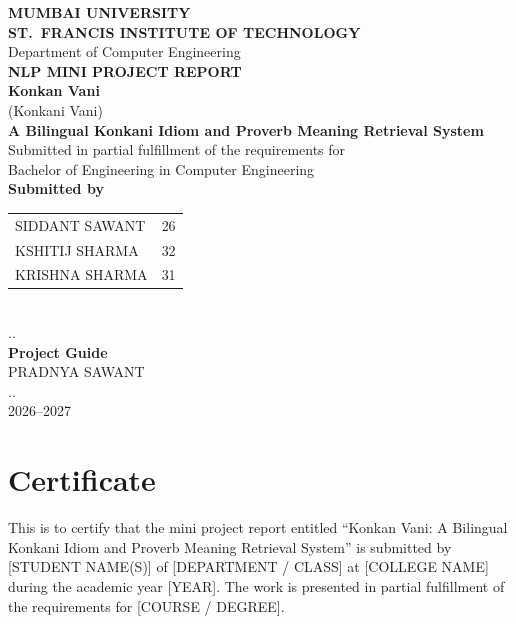 \documentclass[12pt,a4paper]{report}
\begin{document}
\begin{titlepage}
    \begin{center}
        {\LARGE \textbf{MUMBAI UNIVERSITY}}\\[0.4cm]
        {\Large \textbf{ST.\ FRANCIS INSTITUTE OF TECHNOLOGY}}\\[0.3cm]
        {\large Department of Computer Engineering}\\[1.8cm]

        {\Large \textbf{NLP MINI PROJECT REPORT}}\\[1.3cm]

        {\Huge \textbf{Konkan Vani}}\\[0.4cm]
        {\large (Konkani Vani)}\\[0.7cm]
        {\large \textbf{A Bilingual Konkani Idiom and Proverb Meaning Retrieval System}}\\[1.2cm]

        Submitted in partial fulfillment of the requirements for\\
        Bachelor of Engineering in Computer Engineering\\[1.2cm]

        {\large \textbf{Submitted by}}\\[0.3cm]
        \begin{tabular}{ll}
            SIDDANT SAWANT & 26\\
            KSHITIJ SHARMA & 32\\
            KRISHNA SHARMA & 31\\
        \end{tabular}\\[0.9cm]

        ..\\[0.2cm]
        {\large \textbf{Project Guide}}\\[0.2cm]
        {\large PRADNYA SAWANT}\\[0.9cm]

        ..\\[0.4cm]
        {\large 2026--2027}
    \end{center}
\end{titlepage}


\chapter*{Certificate}
This is to certify that the mini project report entitled ``Konkan Vani: A Bilingual
Konkani Idiom and Proverb Meaning Retrieval System'' is submitted by
[STUDENT NAME(S)] of [DEPARTMENT / CLASS] at [COLLEGE NAME] during the academic
year [YEAR]. The work is presented in partial fulfillment of the requirements for
[COURSE / DEGREE].
\end{document}
